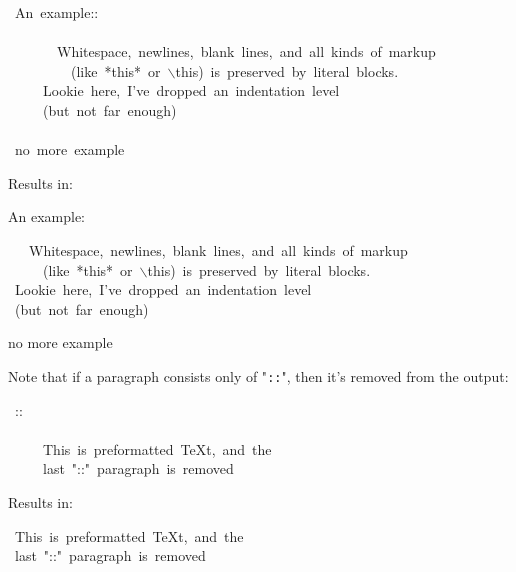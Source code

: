 \documentclass[12pt]{article}
\begin{document}
\begin{ttfamily}\begin{flushleft}
\mbox{~An~example::}\\
\mbox{}\\
\mbox{~~~~~~~Whitespace,~newlines,~blank~lines,~and~all~kinds~of~markup}\\
\mbox{~~~~~~~~~(like~*this*~or~$\backslash$this)~is~preserved~by~literal~blocks.}\\
\mbox{~~~~~Lookie~here,~I've~dropped~an~indentation~level}\\
\mbox{~~~~~(but~not~far~enough)}\\
\mbox{}\\
\mbox{~no~more~example}\\
\end{flushleft}\end{ttfamily}

Results in:

An example:

\begin{ttfamily}\begin{flushleft}
\mbox{~~~Whitespace,~newlines,~blank~lines,~and~all~kinds~of~markup}\\
\mbox{~~~~~(like~*this*~or~$\backslash$this)~is~preserved~by~literal~blocks.}\\
\mbox{~Lookie~here,~I've~dropped~an~indentation~level}\\
\mbox{~(but~not~far~enough)}\\
\end{flushleft}\end{ttfamily}

no more example

\hypertarget{lempty-double-colon}{}

Note that if a paragraph consists only of "\texttt{::}", then it's removed
from the output:

\begin{ttfamily}\begin{flushleft}
\mbox{~::}\\
\mbox{}\\
\mbox{~~~~~This~is~preformatted~\TeX{}t,~and~the}\\
\mbox{~~~~~last~"::"~paragraph~is~removed}\\
\end{flushleft}\end{ttfamily}

Results in:

\begin{ttfamily}\begin{flushleft}
\mbox{~This~is~preformatted~\TeX{}t,~and~the}\\
\mbox{~last~"::"~paragraph~is~removed}\\
\end{flushleft}\end{ttfamily}
\end{document}
